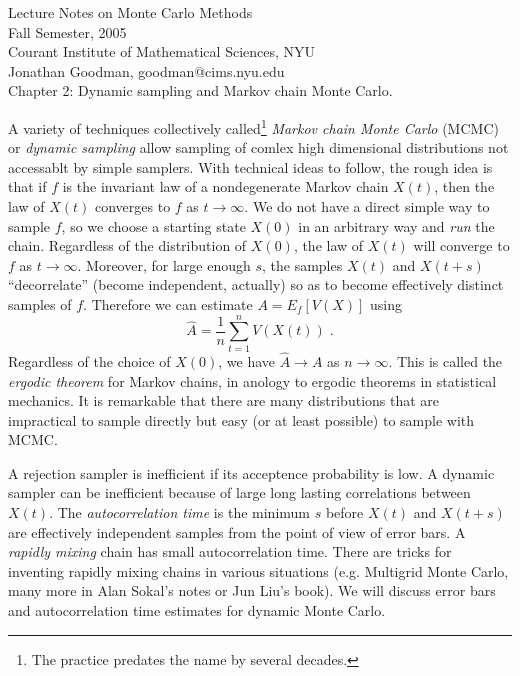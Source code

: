 \documentclass{article}
\begin{document}
\begin{center} 
Lecture Notes on Monte Carlo Methods \\
Fall Semester, 2005 \\
Courant Institute of Mathematical Sciences, NYU \\
Jonathan Goodman, goodman@cims.nyu.edu \\ 
\vspace{.6cm}
\large 
Chapter 2:  Dynamic sampling and Markov chain Monte Carlo.
\normalsize
\end{center}

A variety of techniques collectively 
called\footnote{The practice predates the name by several decades.} 
{\em Markov chain Monte Carlo} (MCMC) or {\em dynamic sampling} allow sampling of 
comlex high dimensional distributions not accessablt by simple samplers.
With technical ideas to follow, the rough idea is that if $f$ is the invariant law 
of a nondegenerate Markov chain $X(t)$, then the law of $X(t)$ converges to $f$ as 
$t \to \infty$.
We do not have a direct simple way to sample $f$, so we choose a starting state 
$X(0)$ in an arbitrary way and {\em run} the chain.
Regardless of the distribution of $X(0)$, the law of $X(t)$ will converge to $f$
as $t\to\infty$.
Moreover, for large enough $s$, the samples $X(t)$ and $X(t+s)$ ``decorrelate''
(become independent, actually) so as to become effectively distinct samples of $f$.
Therefore we can estimate $A = E_f[V(X)]$ using
\begin{equation}
\widehat{A} = \frac{1}{n} \sum_{t=1}^n V(X(t)) \; .
\end{equation}
Regardless of the choice of $X(0)$, we have $\widehat{A} \to A$ as $n \to\infty$.
This is called the {\em ergodic theorem} for Markov chains, in anology to ergodic
theorems in statistical mechanics.
It is remarkable that there are many distributions that are impractical to sample
directly but easy (or at least possible) to sample with MCMC.

A rejection sampler is inefficient if its acceptence probability is low.
A dynamic sampler can be inefficient because of large long lasting correlations
between $X(t)$.
The {\em autocorrelation time} is the minimum $s$ before $X(t)$ and $X(t+s)$ 
are effectively independent samples from the point of view of error bars.
A {\em rapidly mixing} chain has small autocorrelation time.
There are tricks for inventing rapidly mixing chains in various situations
(e.g. Multigrid Monte Carlo, many more in Alan Sokal's notes or Jun Liu's book).
We will discuss error bars and autocorrelation time estimates for dynamic Monte Carlo.
\end{document}

